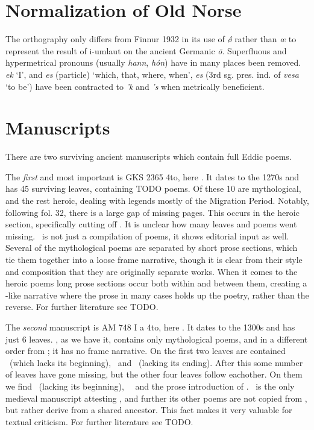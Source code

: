   \section{Normalization of Old Norse}
    The orthography only differs from Finnur 1932 in its use of \emph{ǿ} rather than \emph{œ} to represent the result of i-umlaut on the ancient Germanic \emph{ō}.
    Superfluous and hypermetrical pronouns (usually \emph{hann}, \emph{hón}) have in many places been removed. \emph{ek} ‘I’, and \emph{es} (particle) ‘which, that, where, when’, \emph{es} (3rd sg. pres. ind. of \emph{vesa} ‘to be’) have been contracted to \emph{’k} and \emph{’s} when metrically beneficient.

  \section{Manuscripts}
    There are two surviving ancient manuscripts which contain full Eddic poems.

    The \emph{first} and most important is GKS 2365 4to, here \Regius. It dates to the 1270s and has 45 surviving leaves, containing TODO poems. Of these 10 are mythological, and the rest heroic, dealing with legends mostly of the Migration Period. Notably, following fol. 32, there is a large gap of missing pages. This occurs in the heroic section, specifically cutting off \Sigrdrifumal. It is unclear how many leaves and poems went missing.
    \Regius\ is not just a compilation of poems, it shows editorial input as well. Several of the mythological poems are separated by short prose sections, which tie them together into a loose frame narrative, though it is clear from their style and composition that they are originally separate works. When it comes to the heroic poems long prose sections occur both within and between them, creating a -like narrative where the prose in many cases holds up the poetry, rather than the reverse. For further literature see TODO.

    The \emph{second} manuscript is AM 748 I a 4to, here \AM. It dates to the 1300s and has just 6 leaves. \AM, as we have it, contains only mythological poems, and in a different order from \Regius; it has no frame narrative. On the first two leaves are contained \Harbardsljod\ (which lacks its beginning), \Baldrsdraumar\ and \Skirnismal\ (lacking its ending). After this some number of leaves have gone missing, but the other four leaves follow eachother. On them we find \Vafthrudnismal\ (lacking its beginning), \Grimnismal\, \Hymiskvida\ and the prose introduction of \Volundarkvida. \AM\ is the only medieval manuscript attesting \Baldrsdraumar, and further its other poems are not copied from \Regius, but rather derive from a shared ancestor. This fact makes it very valuable for textual criticism. For further literature see TODO.


